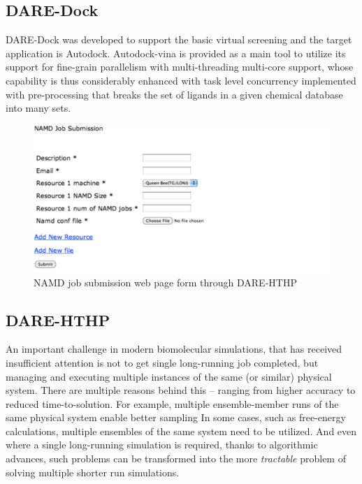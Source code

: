 \documentclass{sig-alternate}
\begin{document}
\subsection{DARE-Dock}
DARE-Dock was developed to support the basic virtual screening and the target application is Autodock\cite{autodock}.  Autodock-vina is provided as a main tool to utilize its support for fine-grain parallelism with multi-threading multi-core support, whose capability is thus considerably enhanced with task level concurrency implemented with pre-processing that breaks the set of ligands in a given chemical database into many sets\cite{autodock-vina}.  

\begin{figure}
 \centering
\includegraphics[scale=0.35]{figures/NAMD1.pdf}

\caption{\small NAMD job submission web page form through DARE-HTHP} 
\end{figure}

\subsection{DARE-HTHP}

An important challenge in modern biomolecular simulations, that has
received insufficient attention is not to get single long-running job
completed, but managing and executing multiple instances of the same
(or similar) physical system.  There are multiple reasons behind this
-- ranging from higher accuracy to reduced time-to-solution. For
example, multiple ensemble-member runs of the same physical system
enable better sampling In some cases, such as free-energy
calculations, multiple ensembles of the same system need to be
utilized. And even where a single long-running simulation is required,
thanks to algorithmic advances, such problems can be transformed into
the more {\it tractable} problem of solving multiple shorter run
simulations.
\end{document}
